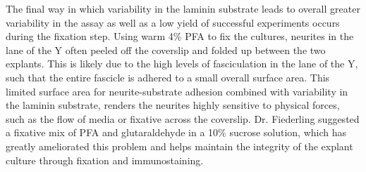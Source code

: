 The final way in which variability in the laminin substrate leads to overall greater variability in the assay as well as a low yield of successful experiments occurs during the fixation step.
Using warm 4\% PFA to fix the cultures, neurites in the lane of the Y often peeled off the coverslip and folded up between the two explants.
This is likely due to the high levels of fasciculation in the lane of the Y, such that the entire fascicle is adhered to a small overall surface area.
This limited surface area for neurite-substrate adhesion combined with variability in the laminin substrate, renders the neurites highly sensitive to physical forces, such as the flow of media or fixative across the coverslip.
Dr. Fiederling suggested a fixative mix of PFA and glutaraldehyde in a 10\% sucrose solution, which has greatly ameliorated this problem and helps maintain the integrity of the explant culture through fixation and immunostaining.